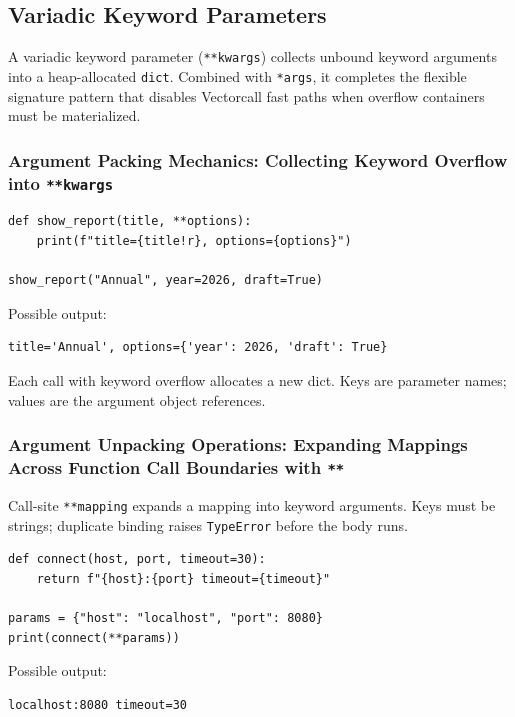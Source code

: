 \subsection{Variadic Keyword Parameters}

A variadic keyword parameter (\texttt{**kwargs}) collects unbound keyword arguments into a heap-allocated \texttt{dict}. Combined with \texttt{*args}, it completes the flexible signature pattern that disables Vectorcall fast paths when overflow containers must be materialized.

\subsubsection{Argument Packing Mechanics: Collecting Keyword Overflow into \texttt{**kwargs}}

\begin{verbatim}
def show_report(title, **options):
    print(f"title={title!r}, options={options}")

show_report("Annual", year=2026, draft=True)
\end{verbatim}

Possible output:

\begin{verbatim}
title='Annual', options={'year': 2026, 'draft': True}
\end{verbatim}

Each call with keyword overflow allocates a new dict. Keys are parameter names; values are the argument object references.

\subsubsection{Argument Unpacking Operations: Expanding Mappings Across Function Call Boundaries with \texttt{**}}

Call-site \texttt{**mapping} expands a mapping into keyword arguments. Keys must be strings; duplicate binding raises \texttt{TypeError} before the body runs.

\begin{verbatim}
def connect(host, port, timeout=30):
    return f"{host}:{port} timeout={timeout}"

params = {"host": "localhost", "port": 8080}
print(connect(**params))
\end{verbatim}

Possible output:

\begin{verbatim}
localhost:8080 timeout=30
\end{verbatim}

